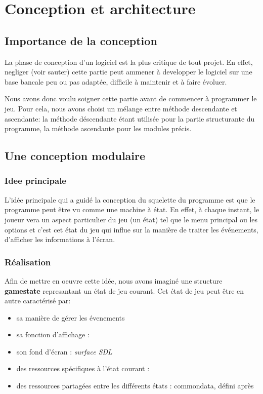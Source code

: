 \section{Conception et architecture}
\subsection{Importance de la conception} La phase de conception d'un
logiciel est la plus critique de tout projet. En effet, negliger
(voir sauter) cette partie peut ammener à developper le logiciel sur
une base bancale peu ou pas adaptée, difficile à maintenir et à faire évoluer.

Nous avons donc voulu soigner cette partie avant de commencer à
programmer le jeu. Pour cela, nous avons choisi un mélange entre
méthode descendante et ascendante: la méthode déscendante étant
utilisée pour la partie structurante du programme, la méthode
ascendante pour les modules précis.

\subsection{Une conception modulaire}
\subsubsection{Idee principale} L'idée principale qui a guidé la
conception du squelette du programme est que le programme peut être vu
comme une machine à état. En effet, à chaque instant, le joueur vera
un aspect particulier du jeu (un état) tel que le menu principal ou
les options et c'est cet état du jeu qui influe sur la manière de traiter les événements,
d'afficher les informations à l'écran.

\subsubsection{Réalisation}
Afin de mettre en oeuvre cette idée, nous avons imaginé une structure
\textbf{game\textunderscore state} represantant un état de jeu courant. Cet
état de jeu peut être en autre caractérisé par: 
\begin{itemize}
  \item sa manière de gérer les évenements 
  \item sa fonction d'affichage : 
  \item son fond d'écran : \textit{surface SDL}
  \item des ressources spécifiques à l'état courant : 
  \item des ressources partagées entre les différents états :
    common\textunderscore data, défini après
\end{itemize}
 
